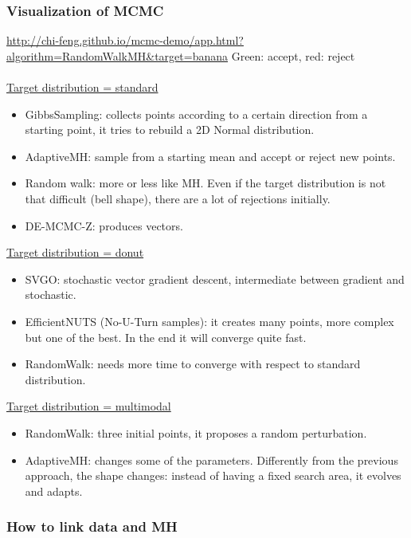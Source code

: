 \subsubsection{Visualization of MCMC}

\url{http://chi-feng.github.io/mcmc-demo/app.html?algorithm=RandomWalkMH\&target=banana}
\noindent
Green: accept, red: reject
\\
\\
\noindent
\underline{Target distribution = standard}

\begin{itemize}
\tightlist
\item
  GibbsSampling: collects points according to a certain direction from a
  starting point, it tries to rebuild a 2D Normal distribution.
\item
  AdaptiveMH: sample from a starting mean and accept or reject new
  points.
\item
  Random walk: more or less like MH. Even if the target distribution is
  not that difficult (bell shape), there are a lot of rejections
  initially.
\item
  DE-MCMC-Z: produces vectors.
\end{itemize}
\noindent
\underline{Target distribution = donut}

\begin{itemize}
\tightlist
\item
  SVGO: stochastic vector gradient descent, intermediate between
  gradient and stochastic.
\item
  EfficientNUTS (No-U-Turn samples): it creates many points, more
  complex but one of the best. In the end it will converge quite fast.
\item
  RandomWalk: needs more time to converge with respect to standard
  distribution.
\end{itemize}
\noindent
\underline{Target distribution = multimodal}

\begin{itemize}
\tightlist
\item
  RandomWalk: three initial points, it proposes a random perturbation.
\item
  AdaptiveMH: changes some of the parameters. Differently from the
  previous approach, the shape changes: instead of having a fixed search
  area, it evolves and adapts.
\end{itemize}


\subsubsection{How to link data and MH}

